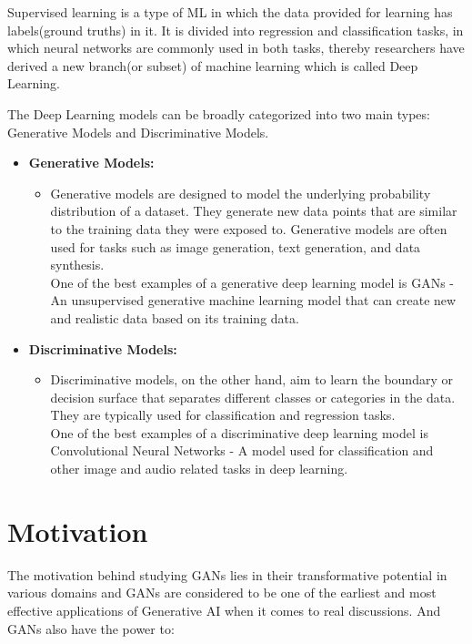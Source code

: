 \clearpage

\noindent
Supervised learning is a type of ML in which the data provided for learning has labels(ground truths) in it. It is divided into regression and classification tasks, in which neural networks are commonly used in both tasks, thereby researchers have derived a new branch(or subset) of machine learning which is called Deep Learning.

\noindent
The Deep Learning models can be broadly categorized into two main types: Generative Models and Discriminative Models.

\begin{itemize}
    \item \textbf{Generative Models:}
    \begin{itemize}
        \item Generative models are designed to model the underlying probability distribution of a dataset\cite{GenAI}. They generate new data points that are similar to the training data they were exposed to. Generative models are often used for tasks such as image generation, text generation, and data synthesis.\\
        One of the best examples of a generative deep learning model is GANs - An unsupervised generative machine learning model that can create new and realistic data based on its training data.
    \end{itemize}

    \item \textbf{Discriminative Models:}
    \begin{itemize}
        \item Discriminative models, on the other hand, aim to learn the boundary or decision surface that separates different classes or categories in the data. They are typically used for classification and regression tasks.\\
        One of the best examples of a discriminative deep learning model is Convolutional Neural Networks - A model used for classification and other image and audio related tasks in deep learning.
    \end{itemize}
\end{itemize}

\clearpage

\section{Motivation}

\noindent The motivation behind studying GANs lies in their transformative potential in various domains and GANs are considered to be one of the earliest and most effective applications of Generative AI when it comes to real discussions. And GANs also have the power to:

